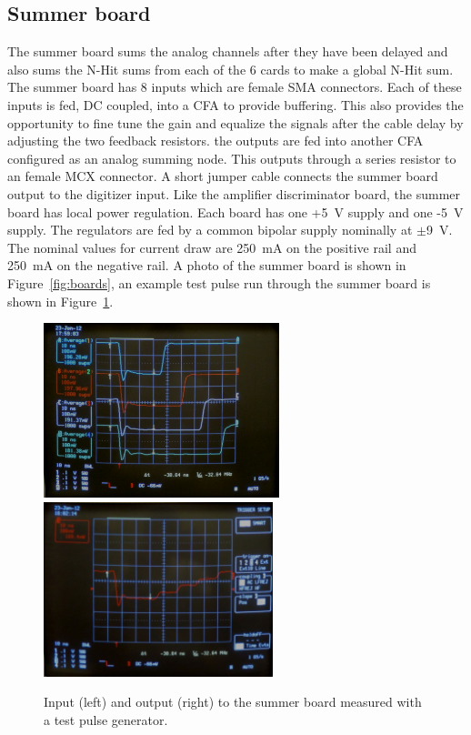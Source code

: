 \documentclass[review,number,sort&compress]{elsarticle}
\begin{document}
\subsection{Summer board}
\label{sec:Sum}
%
The summer board sums the analog channels after they have been
delayed and also sums the N-Hit sums from each of the 6 cards to make
a global N-Hit sum. The summer board has 8 inputs which are female
SMA connectors. Each of these inputs is fed, DC coupled, into a CFA
to provide buffering. This also provides the opportunity to fine tune
the gain and equalize the signals after the cable delay by adjusting
the two feedback resistors. the outputs are fed into another CFA
configured as an analog summing node. This outputs through a series
resistor to an female MCX connector. A short jumper cable connects
the summer board output to the digitizer input. Like the amplifier
discriminator board, the summer board has local power regulation.
Each board has one +5~V supply and one -5~V supply. The regulators are
fed by a common bipolar supply nominally at $\pm$9~V.
The nominal values for current draw are 250~mA on the positive
rail and 250~mA on the negative rail. A photo of the summer
board is shown in Figure~\ref{fig:boards}, an example test pulse run
through the summer board is shown in Figure~\ref{fig:summerpulse}.

\begin{figure}[ht]
	\begin{center}
		\includegraphics[height=2in, keepaspectratio=true]{graphics/sumpulseinput.jpg}
		\includegraphics[height=2in, keepaspectratio=true]{graphics/sumpulseoutput.jpg}
		\caption{Input (left) and output (right) to the summer board measured with a test pulse generator.
		\label{fig:summerpulse}}
	\end{center}
\end{figure}
\end{document}
